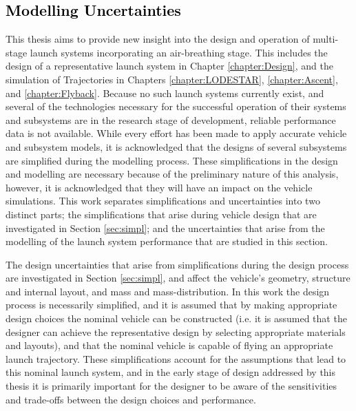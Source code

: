 





\textcolor{black}{
\chapter{Modelling Uncertainties}\label{Appendix:unc}
}


\noindent
This thesis aims to provide new insight into the design and operation of multi-stage launch systems incorporating an air-breathing stage. This includes the design of a representative launch system in Chapter \ref{chapter:Design}, and the simulation of Trajectories in Chapters \ref{chapter:LODESTAR}, \ref{chapter:Ascent}, and \ref{chapter:Flyback}.
Because no such launch systems currently exist, and several of the technologies necessary for the successful operation of their systems and subsystems are in the research stage of development, reliable performance data is not available. While every effort has been made to apply accurate vehicle and subsystem models, it is acknowledged that the designs of several subsystems are simplified during the modelling process. These simplifications in the design and modelling are necessary because of the preliminary nature of this analysis, however, it is acknowledged that they will have an impact on the vehicle simulations. 
This work separates simplifications and uncertainties into two distinct parts; the simplifications that arise during vehicle design that are investigated in Section \ref{sec:simpl}; and the uncertainties that arise from the modelling of the launch system performance that are studied in this section. 

The design uncertainties that arise from simplifications during the design process are investigated in Section \ref{sec:simpl}, and affect the vehicle's geometry, structure and internal layout, and mass and mass-distribution. In this work the design process is necessarily simplified, and it is assumed that by making appropriate design choices the nominal vehicle can be constructed (i.e. it is assumed that the designer can achieve the representative design by selecting appropriate materials and layouts), and that the nominal vehicle is capable of flying an appropriate launch trajectory. These simplifications account for the assumptions that lead to this nominal launch system, and in the early stage of design addressed by this thesis it is primarily important for the designer to be aware of the sensitivities and trade-offs between the design choices and performance. 

